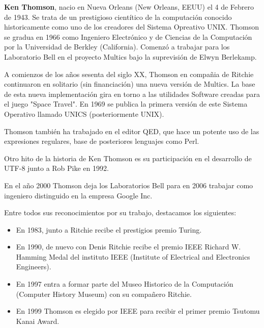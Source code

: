 \textbf{Ken Thomson}, nacio en Nueva Orleans (New Orleans, EEUU) el 4 de Febrero de 1943. Se trata de un prestigioso cientítico de la computación conocido historicamente como uno de los creadores del Sistema Opreativo UNIX. Thomson se gradua en 1966 como Ingeniero Electrónico y de Ciencias de la Computación por la Universidad de Berkley (California). Comenzó a trabajar para los Laboratorio Bell en el proyecto Multics bajo la suprevisión de Elwyn Berlekamp.


A comienzos de los años sesenta del siglo XX, Thomson en compañia de Ritchie continuaron en solitario (sin financiación) una nueva versión de Multics. La base de esta nueva implementación gira en torno a las utilidades Software creadas para el juego "Space Travel". En 1969 se publica la primera versión de este Sistema Operativo llamado UNICS (posteriormente UNIX).


Thomson también ha trabajado en el editor QED, que hace un potente uso de las expresiones regulares, base de posteriores lenguajes como Perl.


Otro hito de la historia de Ken Thomson es su participación en el desarrollo de UTF-8 junto a Rob Pike en 1992.


En el año 2000 Thomson deja los Laboratorios Bell para en 2006 trabajar como ingeniero distinguido en la empresa Google Inc.


Entre todos sus reconocimientos por su trabajo, destacamos los siguientes:

\begin{itemize}
\item En 1983, junto a Ritchie recibe el prestigios premio Turing.
\item En 1990, de nuevo con Denis Ritchie recibe el premio IEEE Richard W. Hamming Medal del instituto IEEE (Institute of Electrical and Electronics Engineers).
\item En 1997 entra a formar parte del Museo Historico de la Computación (Computer History Museum) con su compañero Ritchie.
\item En 1999 Thomson es elegido por IEEE para recibir el primer premio Tsutomu Kanai Award.
\end{itemize}